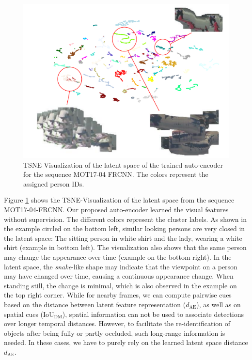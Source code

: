 \begin{figure}[!t]
	\begin{center}
		\includegraphics[width=0.7\linewidth]{Fig_5_figure.pdf}
	\end{center}
	\caption{TSNE Visualization of the latent space of the trained auto-encoder for the sequence MOT17-04 FRCNN. The colors represent the assigned person IDs.}
	\label{fig:graph4}
	
\end{figure}

Figure \ref{fig:graph4} shows the TSNE-Visualization \cite{maaten2008visualizing} of the latent space from the sequence MOT17-04-FRCNN. 
Our proposed auto-encoder learned the visual features without supervision. 
The different colors represent the cluster labels. 
As shown in the example circled on the bottom left, similar looking persons are very closed in the latent space: The sitting person in white shirt and the lady, wearing a white shirt (example in bottom left).
The visualization also shows that the same person may change the appearance over time (example on the bottom right). 
In the latent space, the \textit{snake}-like shape may indicate that the viewpoint on a person may have changed over time, causing a continuous appearance change. 
When standing still, the change is minimal, which is also observed in the example on the top right corner.
While for nearby frames, we can compute pairwise cues based on the distance between latent feature representation ($d_{\mathrm{AE}}$), as well as on spatial cues (IoU$_{\mathrm{DM}}$), spatial information can not be used to associate detections over longer temporal distances. 
However, to facilitate the re-identification of objects after being fully or partly occluded, such long-range information is needed.
In these cases, we have to purely rely on the learned latent space distance $d_{\mathrm{AE}}$. 

